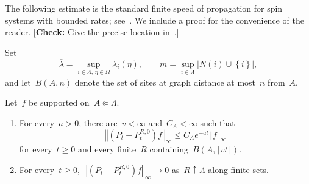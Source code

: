 \documentclass[EJP,preprint,NODS,nobera]{ejpecp}
\newcommand{\bb}[1]{\left(#1\right)}
\newcommand{\cb}[1]{\left\{#1\right\}}
\newcommand{\norm}[1]{\left\Vert#1\right\Vert}
\newcommand{\abs}[1]{\left|#1\right|}
\newcommand{\authorcheck}[1]{{\color{blue}[\textbf{Check:} #1]}}
\begin{document}
The following estimate is the standard finite speed of propagation for spin
systems with bounded rates; see~\cite{Liggett1985}. We include a proof for the
convenience of the reader.
\authorcheck{Give the precise location in~\cite{Liggett1985}.}

Set
\begin{equation*}
\overline\lambda
=
\sup_{i\in\Lambda,\,\eta\in\Omega}\lambda_i(\eta),
\qquad
m
=
\sup_{i\in\Lambda}\abs{N(i)\cup\cb{i}},
\end{equation*}
and let~$B(A,n)$ denote the set of sites at graph distance at most~$n$
from~$A$.

\begin{lemma}
\label{lem:finite-propagation}
Let~$f$ be supported on~$A\Subset\Lambda$.
\begin{enumerate}[label=\textup{(\alph*)}]
\item For every~$a>0$, there are~$v<\infty$ and~$C_A<\infty$ such that
\begin{equation}
\label{eq:finite-propagation}
\norm{\bb{P_t-P_t^{R,0}}f}_\infty
\leq
C_Ae^{-at}\norm f_\infty
\end{equation}
for every~$t\geq0$ and every finite~$R$ containing~$B\bb{A,\lceil vt\rceil}$.
\item For every~$t\geq0$,~$\norm{\bb{P_t-P_t^{R,0}}f}_\infty\to0$
as~$R\uparrow\Lambda$ along finite sets.
\end{enumerate}
\end{lemma}
\end{document}
